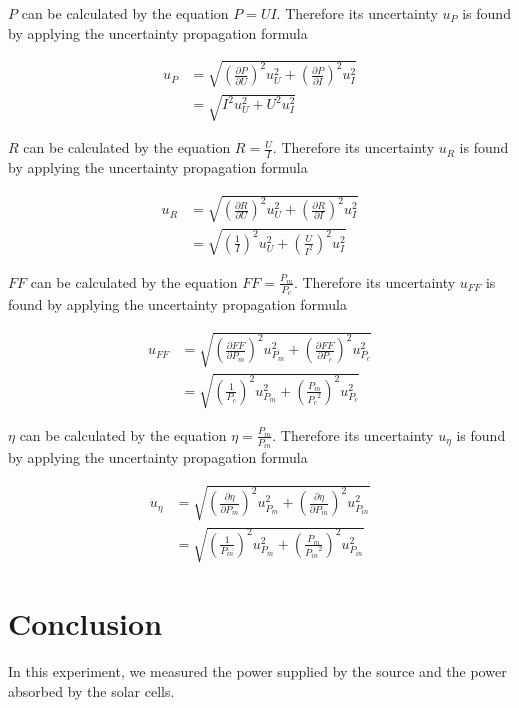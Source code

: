 \documentclass{article}
\begin{document}
{{$P$ can be calculated by the equation $P=UI$. Therefore its uncertainty $u_P$ is found by applying the uncertainty propagation formula

\begin{align*}
u_P&=\sqrt{\left(\frac{\partial P}{\partial U}\right)^2u_U^2+\left(\frac{\partial P}{\partial I}\right)^2u_{I}^2}\\
&=\sqrt{I^2u_U^2+U^2u_I^2}
\end{align*}

$R$ can be calculated by the equation $R=\frac{U}{I}$. Therefore its uncertainty $u_R$ is found by applying the uncertainty propagation formula

\begin{align*}
u_R&=\sqrt{\left(\frac{\partial R}{\partial U}\right)^2u_U^2+\left(\frac{\partial R}{\partial I}\right)^2u_{I}^2}\\
&=\sqrt{\left(\frac{1}{I}\right)^2u_U^2+\left(\frac{U}{I^2}\right)^2u_I^2}
\end{align*}

$FF$ can be calculated by the equation $FF=\frac{P_m}{P_{c}}$. Therefore its uncertainty $u_{FF}$ is found by applying the uncertainty propagation formula

\begin{align*}
u_{FF}&=\sqrt{\left(\frac{\partial FF}{\partial P_m}\right)^2u_{P_m}^2+\left(\frac{\partial FF}{\partial P_{c}}\right)^2u_{P_{c}}^2}\\
&=\sqrt{\left(\frac{1}{P_{c}}\right)^2u_{P_m}^2+\left(\frac{P_m}{{P_{c}}^2}\right)^2u_{P_{c}}^2}
\end{align*}

$\eta$ can be calculated by the equation $\eta=\frac{P_m}{P_{in}}$. Therefore its uncertainty $u_\eta$ is found by applying the uncertainty propagation formula

\begin{align*}
u_\eta&=\sqrt{\left(\frac{\partial \eta}{\partial P_m}\right)^2u_{P_m}^2+\left(\frac{\partial \eta}{\partial P_{in}}\right)^2u_{P_{in}}^2}\\
&=\sqrt{\left(\frac{1}{P_{in}}\right)^2u_{P_m}^2+\left(\frac{P_m}{{P_{in}}^2}\right)^2u_{P_{in}}^2}
\end{align*}

\section{Conclusion}

In this experiment, we measured the power supplied by the source and the power absorbed by the solar cells.\\

}}
\end{document}
